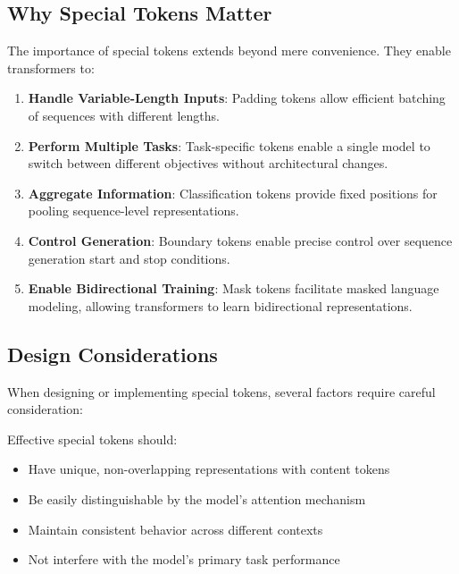 \subsection{Why Special Tokens Matter}

The importance of special tokens extends beyond mere convenience. They enable transformers to:

\begin{enumerate}
\item \textbf{Handle Variable-Length Inputs}: Padding tokens allow efficient batching of sequences with different lengths.

\item \textbf{Perform Multiple Tasks}: Task-specific tokens enable a single model to switch between different objectives without architectural changes.

\item \textbf{Aggregate Information}: Classification tokens provide fixed positions for pooling sequence-level representations.

\item \textbf{Control Generation}: Boundary tokens enable precise control over sequence generation start and stop conditions.

\item \textbf{Enable Bidirectional Training}: Mask tokens facilitate masked language modeling, allowing transformers to learn bidirectional representations.
\end{enumerate}
\begin{comment}
Feedback: This list is a great summary. To avoid it being just a dry list, you could frame it as "Without special tokens, transformers would struggle to..." For example: "1. Handle variable-length inputs: Without padding tokens, every input in a batch would need to be the exact same length, making practical applications incredibly inefficient." This reframing emphasizes their problem-solving nature.
\end{comment}

\subsection{Design Considerations}

When designing or implementing special tokens, several factors require careful consideration:

\begin{principle}
Effective special tokens should:
\begin{itemize}
\item Have unique, non-overlapping representations with content tokens
\item Be easily distinguishable by the model's attention mechanism
\item Maintain consistent behavior across different contexts
\item Not interfere with the model's primary task performance
\end{itemize}
\end{principle}

